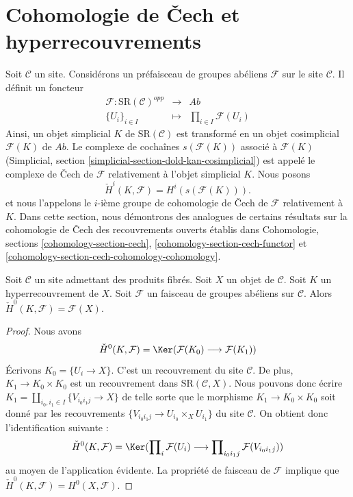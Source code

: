 \section{Cohomologie de {\v C}ech et hyperrecouvrements}
\label{section-hyper-cech}

\noindent
Soit $\mathcal{C}$ un site. Considérons un préfaisceau de
groupes abéliens $\mathcal{F}$ sur le site $\mathcal{C}$.
Il définit un foncteur
\begin{eqnarray*}
\mathcal{F} : \text{SR}(\mathcal{C})^{opp}
& \longrightarrow &
\textit{Ab} \\
\{U_i\}_{i \in I} &
\longmapsto &
\prod\nolimits_{i \in I} \mathcal{F}(U_i)
\end{eqnarray*}
Ainsi, un objet simplicial $K$ de $\text{SR}(\mathcal{C})$
est transformé en un objet cosimplicial $\mathcal{F}(K)$ de $\textit{Ab}$.
Le complexe de cochaînes $s(\mathcal{F}(K))$ associé à $\mathcal{F}(K)$
(Simplicial, section
\ref{simplicial-section-dold-kan-cosimplicial})
est appelé le complexe de {\v C}ech de $\mathcal{F}$ relativement
à l'objet simplicial $K$. Nous posons
$$
\check{H}^i(K, \mathcal{F})
=
H^i(s(\mathcal{F}(K))).
$$
et nous l'appelons le $i$-ième groupe de cohomologie de {\v C}ech
de $\mathcal{F}$ relativement à $K$.
Dans cette section, nous démontrons des analogues de certains résultats sur
la cohomologie de {\v C}ech des recouvrements ouverts établis dans
Cohomologie, sections \ref{cohomology-section-cech},
\ref{cohomology-section-cech-functor} et
\ref{cohomology-section-cech-cohomology-cohomology}.

\begin{lemma}
\label{lemma-h0-cech}
Soit $\mathcal{C}$ un site admettant des produits fibrés.
Soit $X$ un objet de $\mathcal{C}$.
Soit $K$ un hyperrecouvrement de $X$.
Soit $\mathcal{F}$ un faisceau de groupes abéliens sur $\mathcal{C}$.
Alors $\check{H}^0(K, \mathcal{F}) = \mathcal{F}(X)$.
\end{lemma}

\begin{proof}
Nous avons
$$
\check{H}^0(K, \mathcal{F})
=
\Ker(\mathcal{F}(K_0) \longrightarrow \mathcal{F}(K_1))
$$
Écrivons $K_0 = \{U_i \to X\}$. C'est un recouvrement du site
$\mathcal{C}$. De plus, $K_1 \to K_0 \times K_0$
est un recouvrement dans $\text{SR}(\mathcal{C}, X)$. Nous pouvons donc
écrire $K_1 = \amalg_{i_0, i_1 \in I} \{V_{i_0i_1j} \to X\}$
de telle sorte que le morphisme $K_1 \to K_0 \times K_0$ soit donné
par les recouvrements $\{V_{i_0i_1j} \to U_{i_0} \times_X U_{i_1}\}$
du site $\mathcal{C}$. On obtient donc l’identification suivante :
$$
\check{H}^0(K, \mathcal{F})
=
\Ker(
\prod\nolimits_i \mathcal{F}(U_i)
\longrightarrow
\prod\nolimits_{i_0i_1 j} \mathcal{F}(V_{i_0i_1j})
)
$$
au moyen de l'application évidente. La propriété de faisceau de $\mathcal{F}$
implique que $\check{H}^0(K, \mathcal{F}) = H^0(X, \mathcal{F})$.
\end{proof}

